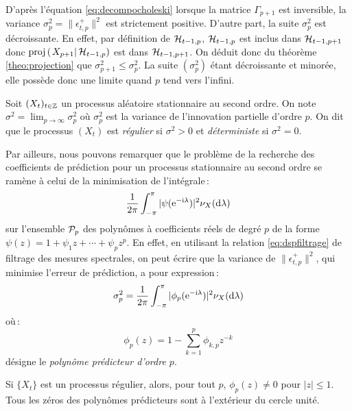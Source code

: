 D'apr\`es l'\'equation \eqref{eq:decompocholeski} lorsque la
matrice $\Gamma_{p+1}$ est inversible, la variance
$\sigma_p^2=\|\epsilon_{t,p}^+\|^2$ est strictement positive.
D'autre part, la suite $\sigma_p^2$ est
d\'ecroissante. En effet, par d\'efinition de $\mathcal{H}_{t-1,p}$,
$\mathcal{H}_{t-1,p}$ est inclus dans $\mathcal{H}_{t-1,p+1}$ donc
$\proj{X_{p+1}}{\cH_{t-1,p}}$ est dans $\mathcal{H}_{t-1,p+1}$.
On d\'eduit donc du th\'eor\`eme \ref{theo:projection} que $\sigma_{p+1}^2\leq\sigma_{p}^2$.
La suite $(\sigma_p^2)$ \'etant d\'ecroissante et minor\'ee, elle poss\`ede
donc une limite quand $p$ tend vers l'infini. 

\begin{definition}
 \label{def:paregulier}
 Soit $(X_t)_{t \in \mathbb{Z}}$ un processus al\'eatoire stationnaire au second
ordre. On note $\sigma^2=\lim_{p\to\infty}\sigma_p^2$ o\`u
$\sigma_p^2$ est la variance de l'innovation partielle
d'ordre $p$. On dit que le processus $(X_t)$ est \emph{r\'egulier} si
$\sigma^2 > 0$ et \emph{d\'eterministe} si $\sigma^2=0$.
\end{definition}


Par ailleurs, nous pouvons remarquer que le probl\`eme de la recherche des coefficients de pr\'ediction pour
un processus stationnaire au second ordre se ram\`ene \`a
celui de la minimisation de l'int\'egrale\,:
\[
   \frac{1}{2\pi}
             \int_{-\pi}^{\pi} |\psi(\mathrm{e}^{-\mathrm{i}\lambda})|^2 \nu_X(\mathrm{d}\lambda)
\]
sur l'ensemble $\mathcal{P}_p$ des polyn\^omes \`a coefficients r\'eels
de degr\'e $p$ de la forme $\psi(z) = 1 + \psi_1 z + \cdots + \psi_p
z^p$. En effet, en utilisant la relation \eqref{eq:dspfiltrage} de
filtrage des mesures spectrales, on peut \'ecrire que la variance de
$ \| \epsilon_{t,p}^+ \|^2$, qui minimise l'erreur de
pr\'ediction, a pour expression\,:
\begin{equation}
\label{eq:variance:innovation:partielle}
 \sigma_p^2
 = \frac{1}{2 \pi} \int_{-\pi}^{\pi} |
    \phi_p(\mathrm{e}^{-\mathrm{i}\lambda})|^2 \nu_X(\mathrm{d}\lambda)
\end{equation}
o\`u\,:
\[
  \phi_p(z) = 1 - \sum_{k=1}^p \phi_{k,p} z^{-k}
\]
d\'esigne le \emph{polyn\^ome pr\'edicteur d'ordre $p$}.
\begin{theorem}
 \label{theo:procregulpredicstable}
 Si $\{ X_t \}$ est un processus r\'egulier, alors, pour
tout $p$, $\phi_p(z) \ne 0$ pour $|z|\leq 1$. Tous les z\'eros des
polyn\^omes pr\'edicteurs sont \`a l'ext\'erieur du cercle unit\'e.
\end{theorem}

